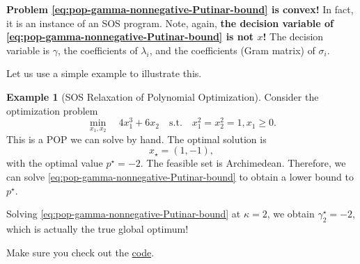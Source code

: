 \documentclass[
]{book}
\theoremstyle{definition}
\theoremstyle{definition}
\newtheorem{example}{Example}[chapter]
\theoremstyle{definition}
\theoremstyle{definition}
\theoremstyle{remark}
\begin{document}
\textbf{Problem \eqref{eq:pop-gamma-nonnegative-Putinar-bound} is convex!} In fact, it is an instance of an SOS program. Note, again, \textbf{the decision variable of \eqref{eq:pop-gamma-nonnegative-Putinar-bound} is not \(x\)!} The decision variable is \(\gamma\), the coefficients of \(\lambda_i\), and the coefficients (Gram matrix) of \(\sigma_i\).

Let us use a simple example to illustrate this.

\begin{example}[SOS Relaxation of Polynomial Optimization]
\protect\hypertarget{exm:SOSRelaxation}{}\label{exm:SOSRelaxation}Consider the optimization problem
\[
\min_{x_1,x_2} \quad 4 x_1^3 + 6 x_2  \quad \mathrm{s.t.}\quad x_1^2 = x_2^2 = 1, x_1 \geq 0.
\]
This is a POP we can solve by hand. The optimal solution is
\[
x_\star = (1,-1),
\]
with the optimal value \(p^\star = -2\).
The feasible set is Archimedean. Therefore, we can solve \eqref{eq:pop-gamma-nonnegative-Putinar-bound} to obtain a lower bound to \(p^\star\).

Solving \eqref{eq:pop-gamma-nonnegative-Putinar-bound} at \(\kappa=2\), we obtain \(\gamma_{2}^\star = -2\), which is actually the true global optimum!

Make sure you check out the \href{https://github.com/ComputationalRobotics/Semidefinite-Examples/blob/main/example_pop.m}{code}.
\end{example}

  
\end{document}
